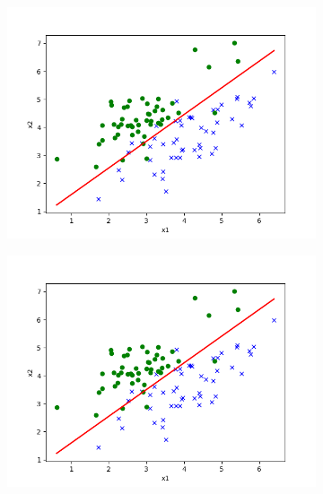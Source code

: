 \begin{answer}
\begin{figure}[htbp]
    \begin{subfigure}[b]{0.5\linewidth}
        \centering
        \includegraphics[width=\linewidth]{output/p01b_pred_2.txt.png}
    \end{subfigure}
    \begin{subfigure}[b]{0.5\linewidth}
        \centering
        \includegraphics[width=\linewidth]{output/p01e_pred_2.txt.png}
    \end{subfigure}

\end{figure}
\end{answer}
